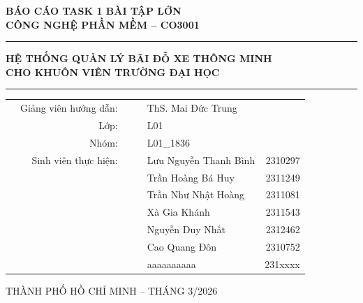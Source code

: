 \begin{titlepage}
\vspace{0.2cm}


\begin{center}
\textbf{{\LARGE BÁO CÁO TASK 1 BÀI TẬP LỚN}} \\[0.5cm]
\textbf{{\LARGE CÔNG NGHỆ PHẦN MỀM -- CO3001}}\\[0.5cm]
\color{blue}
\hrule

\vspace{1cm}

\textbf{{\Large HỆ THỐNG QUẢN LÝ BÃI ĐỖ XE THÔNG MINH }}\\[0.1cm]
\textbf{{\Large CHO KHUÔN VIÊN TRƯỜNG ĐẠI HỌC  }}\\[1cm]

\hrule

\vspace{.5cm}


\begin{table}[h]
    \large
    \centering

    \begin{tabular}{rrrrlr}
        
        & Giảng viên hướng dẫn:&& & ThS. Mai Đức Trung & \\[0.25cm]
        & Lớp: &&& L01 & \\[0.25cm]
        & Nhóm: &&& L01\_1836 & \\[0.25cm]
        
        & Sinh viên thực hiện: &&& Lưu Nguyễn Thanh Bình  & 2310297 \\[0.1cm]
        &                      &&& Trần Hoàng Bá Huy  & 2311249 \\[0.1cm]         
        &                      &&& Trần Như Nhật Hoàng  & 2311081 \\[0.1cm]
        &                      &&& Xà Gia Khánh  & 2311543 \\[0.1cm]
        &                      &&& Nguyễn Duy Nhất & 2312462 \\[0.1cm]
        &                      &&& Cao Quang Đôn  & 2310752 \\[0.1cm]
        &                      &&& aaaaaaaaaa  & 231xxxx \\[0.1cm]        
    \end{tabular}
\end{table}


\end{center}


\vspace{.6cm}
\centerline{\large THÀNH PHỐ HỒ CHÍ MINH -- THÁNG 3/2026}

\end{titlepage}

\restoregeometry
